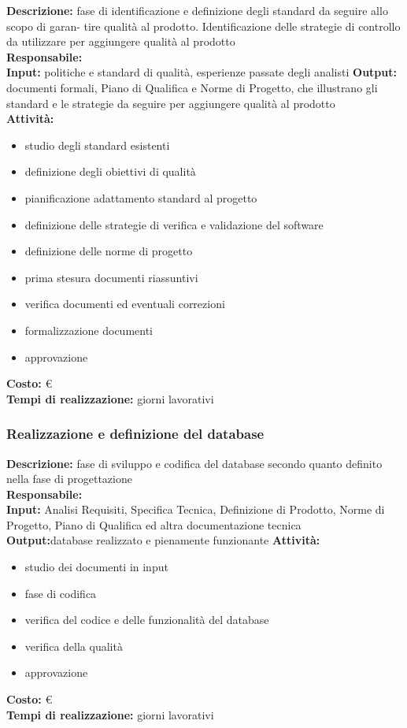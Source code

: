 \textbf{Descrizione:} fase di identificazione e definizione degli standard da seguire allo scopo di garan-
tire qualità al prodotto. Identificazione delle strategie di controllo da utilizzare per
aggiungere qualità al prodotto\\
\linebreak
\textbf{Responsabile:}  \\
\linebreak
\textbf{Input:} politiche e standard di qualità, esperienze passate degli analisti
\textbf{Output:} documenti formali, Piano di Qualifica e Norme di Progetto, che illustrano gli
standard e le strategie da seguire per aggiungere qualità al prodotto\\
\linebreak
\textbf{Attività:}
\begin{itemize}
\item studio degli standard esistenti
\item definizione degli obiettivi di qualità
\item pianificazione adattamento standard al progetto
\item definizione delle strategie di verifica e validazione del software
\item definizione delle norme di progetto
\item prima stesura documenti riassuntivi
\item verifica documenti ed eventuali correzioni
\item formalizzazione documenti
\item approvazione
\end{itemize}
\textbf{Costo:} \euro \\
\textbf{Tempi di realizzazione:}  giorni lavorativi


\subsubsection{Realizzazione e definizione del database}
\textbf{Descrizione:} fase di sviluppo e codifica del database secondo quanto definito nella fase
di progettazione\\
\linebreak
\textbf{Responsabile:} \\
\linebreak
\textbf{Input:} Analisi Requisiti, Specifica Tecnica, Definizione di Prodotto, Norme di Progetto,
Piano di Qualifica ed altra documentazione tecnica\\
\linebreak
\textbf{Output:}database realizzato e pienamente funzionante
\textbf{Attività:}
\begin{itemize}
\item studio dei documenti in input
\item fase di codifica
\item verifica del codice e delle funzionalità del database
\item verifica della qualità
\item approvazione
\end{itemize}
\textbf{Costo:} \euro \\
\textbf{Tempi di realizzazione:}  giorni lavorativi



